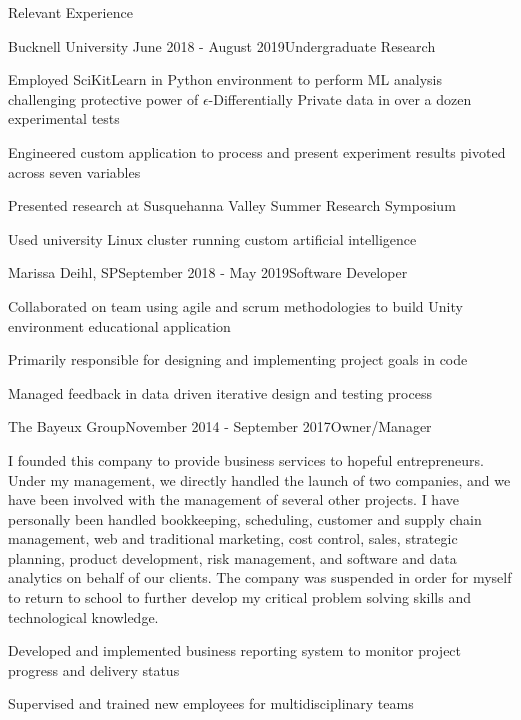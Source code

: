 \documentclass{resume} %
\begin{document}

\begin{rSection}{Relevant Experience}


\begin{rSubsection}{Bucknell University }{June 2018 - August 2019}{Undergraduate Research}{}
\item Employed SciKitLearn in Python environment to perform ML analysis challenging protective power of $\epsilon$-Differentially Private data in over a dozen experimental tests
\item Engineered custom application to process and present experiment results pivoted across seven variables
\item Presented research at Susquehanna Valley Summer Research Symposium
\item Used university Linux cluster running custom artificial intelligence 
\end{rSubsection}


\begin{rSubsection}{Marissa Deihl, SP}{September 2018 - May 2019}{Software Developer}{}
\item Collaborated on team using agile and scrum methodologies to build Unity environment educational application
\item Primarily responsible for designing and implementing project goals in code
\item Managed feedback in data driven iterative design and testing process
\end{rSubsection}


\begin{rSubsection}{The Bayeux Group}{November 2014 - September 2017}{Owner/Manager}{}
\item I founded this company to provide business services to hopeful entrepreneurs. Under my management, we directly handled the launch of two companies, and we have been involved with the management of several other projects. I have personally been handled bookkeeping, scheduling, customer and supply chain management, web and traditional marketing, cost control, sales, strategic planning, product development, risk management, and software and data analytics on behalf of our clients. The company was suspended in order for myself to return to school to further develop my critical problem solving skills and technological knowledge.
\item Developed and implemented business reporting system to monitor project progress and delivery status
\item Supervised and trained new employees for multidisciplinary teams
\end{rSubsection}


\end{rSection}
\end{document}
